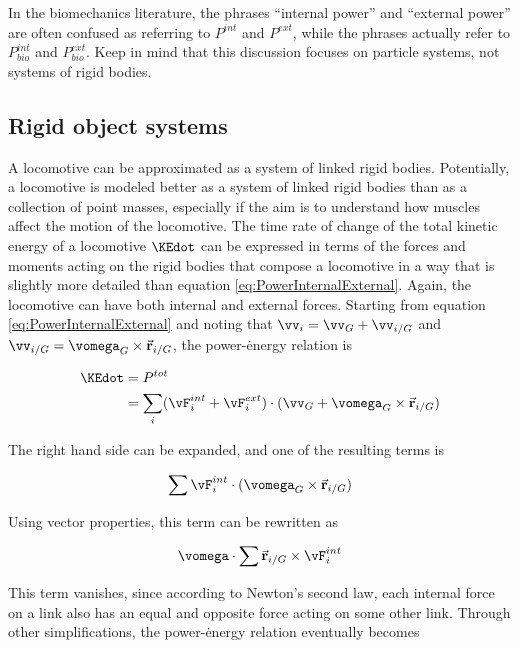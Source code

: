 In the biomechanics literature, the phrases ``internal power'' and ``external power'' are often confused as referring to $P^{int}$ and $P^{ext}$, while the phrases actually refer to $P_{bio}^{int}$ and $P_{bio}^{ext}$. Keep in mind that this discussion focuses on particle systems, not systems of rigid bodies.

\subsection*{Rigid object systems}

A locomotive can be approximated as a system of linked rigid bodies. Potentially, a locomotive is modeled better as a system of linked rigid bodies than as a collection of point masses, especially if the aim is to understand how muscles affect the motion of the locomotive. The time rate of change of the total kinetic energy of a locomotive $\KEdot$ can be expressed in terms of the forces and moments acting on the rigid bodies that compose a locomotive in a way that is slightly more detailed than equation \ref{eq:PowerInternalExternal}.  Again, the locomotive can have both internal and external forces. Starting from equation \ref{eq:PowerInternalExternal} and noting that $\vv_i = \vv_{G} + \vv_{i/G}$ and $\vv_{i/G} = \vomega_{G} \times \vec{\mathbf{r}}_{i/G}$, the power-\.{energy} relation is

\begin{align}
\KEdot &= P^{tot} \notag \\
 &= \sum_{i} (\vF_{i}^{int} + \vF_{i}^{ext} ) \cdot ( \vv_{G} + \vomega_{G} \times \vec{\mathbf{r}}_{i/G})
\end{align}

The right hand side can be expanded, and one of the resulting terms is

\begin{equation}
\sum \vF_{i}^{int} \cdot (\vomega_{G} \times \vec{\mathbf{r}}_{i/G}) \notag
\end{equation}

Using vector properties, this term can be rewritten as

\begin{equation}
\vomega \cdot \sum \vec{\mathbf{r}}_{i/G} \times \vF_{i}^{int} \notag
\end{equation}

This term vanishes, since according to Newton's second law, each internal force on a link also has an equal and opposite force acting on some other link. Through other simplifications, the power-\.{energy} relation eventually becomes

